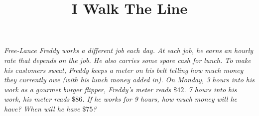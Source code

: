 \documentclass[nooutcomes, noauthor, handout]{ximera}
\title{I Walk The Line}
\begin{document}
\begin{abstract}
\end{abstract}
\maketitle


\begin{problem}
 \emph{Free-Lance Freddy works a different job each day.  At each job, he earns an hourly rate that depends on the
job.  He also carries some spare cash for lunch.  To make his
customers sweat, Freddy keeps a meter on his belt telling how much
money they currently owe (with his lunch money added in).  On Monday, 3 hours into his work as a gourmet burger flipper,
  Freddy's meter reads $\$42$. 7 hours into his work, his meter reads
  $\$86$.  If he works for 9 hours, how much money will he have?  When
  will he have $\$75$?}
  \vskip 3in
  


\end{problem}
\end{document}
